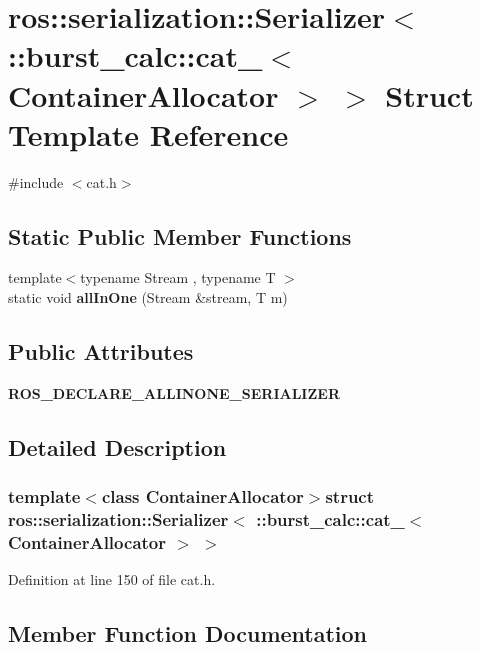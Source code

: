\section{ros\-:\-:serialization\-:\-:\-Serializer$<$ \-:\-:burst\-\_\-calc\-:\-:cat\-\_\-$<$ \-Container\-Allocator $>$ $>$ \-Struct \-Template \-Reference}
\label{structros_1_1serialization_1_1Serializer_3_01_1_1burst__calc_1_1cat___3_01ContainerAllocator_01_4_01_4}


{\ttfamily \#include $<$cat.\-h$>$}

\subsection*{\-Static \-Public \-Member \-Functions}
\begin{DoxyCompactItemize}
\item 
{\footnotesize template$<$typename Stream , typename T $>$ }\\static void {\bf all\-In\-One} (\-Stream \&stream, \-T m)
\end{DoxyCompactItemize}
\subsection*{\-Public \-Attributes}
\begin{DoxyCompactItemize}
\item 
{\bf \-R\-O\-S\-\_\-\-D\-E\-C\-L\-A\-R\-E\-\_\-\-A\-L\-L\-I\-N\-O\-N\-E\-\_\-\-S\-E\-R\-I\-A\-L\-I\-Z\-E\-R}
\end{DoxyCompactItemize}


\subsection{\-Detailed \-Description}
\subsubsection*{template$<$class Container\-Allocator$>$struct ros\-::serialization\-::\-Serializer$<$ \-::burst\-\_\-calc\-::cat\-\_\-$<$ Container\-Allocator $>$ $>$}



\-Definition at line 150 of file cat.\-h.



\subsection{\-Member \-Function \-Documentation}
